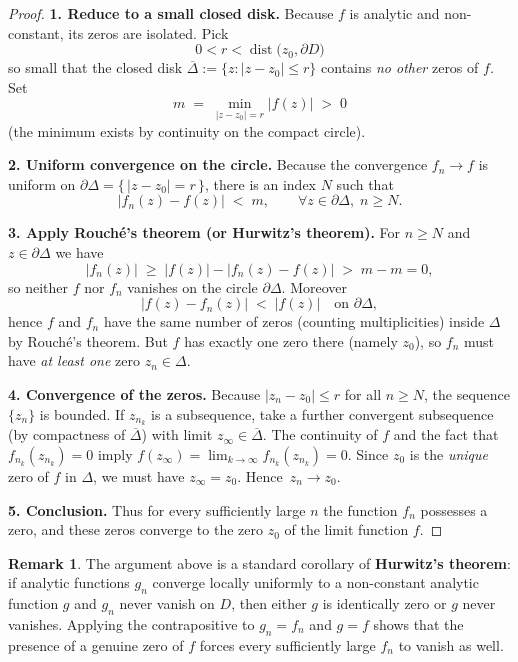 \documentclass[12pt]{article}
\theoremstyle{definition} %
\newtheorem{remark}{Remark}
\theoremstyle{plain} %
\begin{document}
  \begin{proof}
  \textbf{1.  Reduce to a small closed disk.}
  Because \(f\) is analytic and non-constant, its zeros are isolated.
  Pick
  \[
        0<r<\operatorname{dist}\bigl(z_0,\partial D\bigr)
  \]
  so small that the closed disk
  \(\overline{\Delta}:=\{z:|z-z_0|\le r\}\) contains \emph{no other}
  zeros of \(f\).  
  Set
  \[
        m \;=\; \min_{|z-z_0|=r}|f(z)|  \;>\;0
  \]
  (the minimum exists by continuity on the compact circle).
  
  \medskip
  \textbf{2.  Uniform convergence on the circle.}
  Because the convergence \(f_n\to f\) is uniform on
  \(\partial\Delta=\{\,|z-z_0|=r\,\}\), there is an index
  \(N\) such that
  \[
        |f_n(z)-f(z)| \;<\; m ,\qquad
        \forall z\in\partial\Delta,\; n\ge N.
  \]
  
  \medskip
  \textbf{3.  Apply Rouché’s theorem (or Hurwitz’s theorem).}
  For \(n\ge N\) and \(z\in\partial\Delta\) we have
  \[
        |f_n(z)| \;\ge\;
        |f(z)|-|f_n(z)-f(z)|
        \;>\;
        m-m=0 ,
  \]
  so neither \(f\) nor \(f_n\) vanishes on the circle
  \(\partial\Delta\).
  Moreover
  \[
        |f(z)-f_n(z)| \;<\; |f(z)|
        \quad\text{on }\partial\Delta ,
  \]
  hence \(f\) and \(f_n\) have the same number of zeros
  (counting multiplicities) inside \(\Delta\) by Rouché’s theorem.
  But \(f\) has exactly one zero there (namely \(z_0\)),
  so \(f_n\) must have \emph{at least one} zero \(z_n\in\Delta\).
  
  \medskip
  \textbf{4.  Convergence of the zeros.}
  Because \(|z_n-z_0|\le r\) for all \(n\ge N\),
  the sequence \(\{z_n\}\) is bounded.  If \(z_{n_k}\) is a subsequence,
  take a further convergent subsequence (by compactness of
  \(\overline\Delta\)) with limit \(z_\infty\in\overline\Delta\).
  The continuity of \(f\) and the fact that
  \(f_{n_k}(z_{n_k})=0\) imply
  \(f(z_\infty)=\lim_{k\to\infty}f_{n_k}(z_{n_k})=0\).
  Since \(z_0\) is the \emph{unique} zero of \(f\) in \(\Delta\),
  we must have \(z_\infty=z_0\).  Hence \(\,z_n\to z_0\).
  
  \medskip
  \textbf{5.  Conclusion.}
  Thus for every sufficiently large \(n\) the function \(f_n\)
  possesses a zero, and these zeros converge to the zero \(z_0\)
  of the limit function \(f\).
  \end{proof}
  
  \begin{remark}
  The argument above is a standard corollary of
  \textbf{Hurwitz’s theorem}:  
  if analytic functions \(g_n\) converge locally uniformly to
  a non-constant analytic function \(g\) and
  \(g_n\) never vanish on \(D\), then either \(g\) is
  identically zero or \(g\) never vanishes.
  Applying the contrapositive to \(g_n=f_n\) and \(g=f\) shows that
  the presence of a genuine zero of \(f\) forces every
  sufficiently large \(f_n\) to vanish as well.
  \end{remark}
\end{document}
